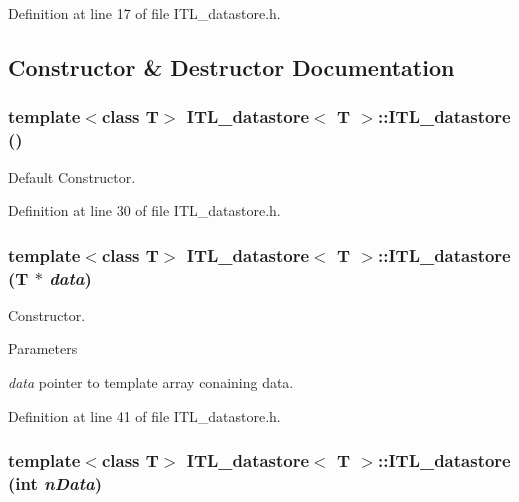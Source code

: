 Definition at line 17 of file ITL\_\-datastore.h.



\subsection{Constructor \& Destructor Documentation}
\hypertarget{classITL__datastore_a1da115b3d395ac0482d2b0c980a2384f}{
\subsubsection[{ITL\_\-datastore}]{\setlength{\rightskip}{0pt plus 5cm}template$<$class T$>$ {\bf ITL\_\-datastore}$<$ T $>$::{\bf ITL\_\-datastore} ()}}
\label{classITL__datastore_a1da115b3d395ac0482d2b0c980a2384f}


Default Constructor. 



Definition at line 30 of file ITL\_\-datastore.h.

\hypertarget{classITL__datastore_a3beff9f7ee4e7ce2a65cc3bce3418b99}{
\subsubsection[{ITL\_\-datastore}]{\setlength{\rightskip}{0pt plus 5cm}template$<$class T$>$ {\bf ITL\_\-datastore}$<$ T $>$::{\bf ITL\_\-datastore} (T $\ast$ {\em data})}}
\label{classITL__datastore_a3beff9f7ee4e7ce2a65cc3bce3418b99}


Constructor. 


\begin{DoxyParams}{Parameters}
\item[{\em data}]pointer to template array conaining data. \end{DoxyParams}


Definition at line 41 of file ITL\_\-datastore.h.

\hypertarget{classITL__datastore_a017cff7441532e53a2a0897cc8790e3a}{
\subsubsection[{ITL\_\-datastore}]{\setlength{\rightskip}{0pt plus 5cm}template$<$class T$>$ {\bf ITL\_\-datastore}$<$ T $>$::{\bf ITL\_\-datastore} (int {\em nData})}}
\label{classITL__datastore_a017cff7441532e53a2a0897cc8790e3a}


